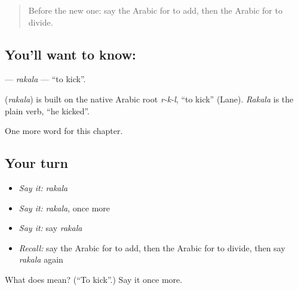 \label{lesson:AR-C230-rakala}



\begin{quote}
Before the new one: say the Arabic for to add, then the Arabic for to divide.
\end{quote}

\subsection*{You'll want to know: }
\textbf{} — \emph{rakala} — \textquotedblleft{}to kick\textquotedblright{}.

\begin{cousinweb}
\textbf{} (\emph{rakala}) is built on the native Arabic root \emph{r-k-l}, \textquotedblleft{}to kick\textquotedblright{} (Lane). \emph{Rakala} is the plain verb, \textquotedblleft{}he kicked\textquotedblright{}.
\end{cousinweb}

\begin{grammarlens}[title={What you've built}]
One more word for this chapter.
\end{grammarlens}

\subsection*{Your turn}
\begin{itemize}
\raggedright
  \item \emph{Say it:} \emph{rakala}
  \item \emph{Say it:} \emph{rakala}, once more
  \item \emph{Say it:} say \emph{rakala}
  \item \emph{Recall:} say the Arabic for to add, then the Arabic for to divide, then say \emph{rakala} again
\end{itemize}

\begin{tcolorbox}[breakable,colback=teal!4,colframe=teal!35!black,title={Before you move on}]
What does  mean? (\textquotedblleft{}To kick\textquotedblright{}.) Say it once more.
\end{tcolorbox}
